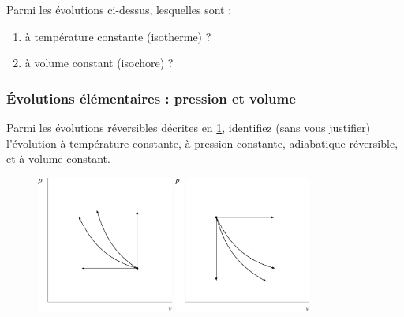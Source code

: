 	Parmi les évolutions ci-dessus, lesquelles sont :
	\begin{enumerate}
		\item à température constante (isotherme) ?
		\item à volume constant (isochore) ?
	\end{enumerate}


\subsubsection{Évolutions élémentaires : pression et volume}
\label{exo_retrouver_pv}

	Parmi les évolutions réversibles décrites en \cref{fig_pvel}, identifiez (sans vous justifier) l’évolution à température constante, à pression constante, adiabatique réversible, et à volume constant.
	
	\begin{figure}[!bh]
		\begin{center}
			\includegraphics[width=0.4\textwidth, max width=0.6\columnwidth]{images/exo_pv_elementaires1.png}
			\includegraphics[width=0.4\textwidth, max width=0.6\columnwidth]{images/exo_pv_elementaires2.png}
		\end{center}
		\label{fig_pvel}
	\end{figure}
	

